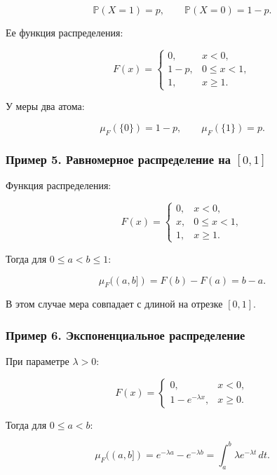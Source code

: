 \documentclass[
  11pt,
  a4paper,
]{article}
\begin{document}
\[
\mathbb P(X=1)=p,\qquad
\mathbb P(X=0)=1-p.
\]

Ее функция распределения:

\[
F(x)=
\begin{cases}
0, & x<0,\\
1-p, & 0\le x<1,\\
1, & x\ge1.
\end{cases}
\]

У меры два атома:

\[
\mu_F(\{0\})=1-p,\qquad
\mu_F(\{1\})=p.
\]

\subsubsection{\texorpdfstring{Пример 5. Равномерное распределение на
\([0,1]\)}{Пример 5. Равномерное распределение на {[}0,1{]}}}\label{ux43fux440ux438ux43cux435ux440-5.-ux440ux430ux432ux43dux43eux43cux435ux440ux43dux43eux435-ux440ux430ux441ux43fux440ux435ux434ux435ux43bux435ux43dux438ux435-ux43dux430-01}

Функция распределения:

\[
F(x)=
\begin{cases}
0, & x<0,\\
x, & 0\le x<1,\\
1, & x\ge1.
\end{cases}
\]

Тогда для \(0\le a<b\le1\):

\[
\mu_F((a,b])=F(b)-F(a)=b-a.
\]

В этом случае мера совпадает с длиной на отрезке \([0,1]\).

\subsubsection{Пример 6. Экспоненциальное
распределение}\label{ux43fux440ux438ux43cux435ux440-6.-ux44dux43aux441ux43fux43eux43dux435ux43dux446ux438ux430ux43bux44cux43dux43eux435-ux440ux430ux441ux43fux440ux435ux434ux435ux43bux435ux43dux438ux435}

При параметре \(\lambda>0\):

\[
F(x)=
\begin{cases}
0, & x<0,\\
1-e^{-\lambda x}, & x\ge0.
\end{cases}
\]

Тогда для \(0\le a<b\):

\[
\mu_F((a,b])=e^{-\lambda a}-e^{-\lambda b}
=
\int_a^b \lambda e^{-\lambda t}\,dt.
\]
\end{document}
